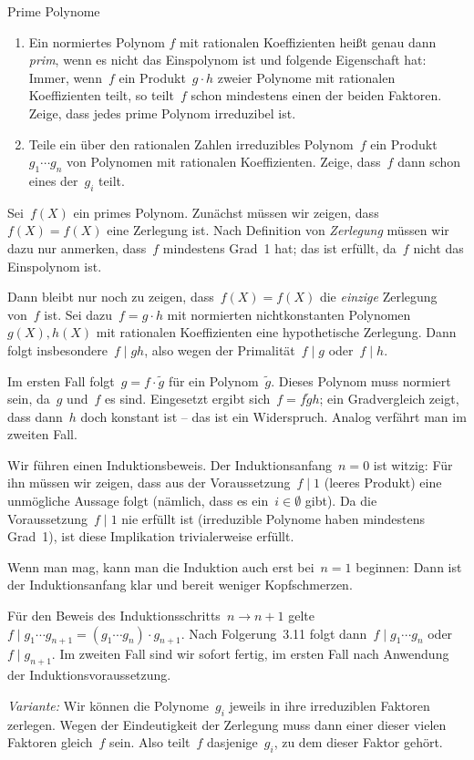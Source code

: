 \documentclass{algblatt}
\begin{document}
\ifloesungen\newpage\fi
\begin{aufgabe}{Prime Polynome}
\begin{enumerate}
\item Ein normiertes Polynom $f$ mit rationalen Koeffizienten heißt
genau dann \emph{prim}, wenn es nicht das Einspolynom ist und folgende
Eigenschaft hat: Immer, wenn~$f$ ein
Produkt~$g \cdot h$ zweier Polynome mit
rationalen Koeffizienten teilt, so teilt~$f$ schon mindestens einen der
beiden Faktoren. Zeige, dass jedes prime Polynom irreduzibel ist.
\item Teile ein über den rationalen Zahlen irreduzibles Polynom~$f$ ein
Produkt~$g_1 \cdots g_n$ von Polynomen mit rationalen Koeffizienten.
Zeige, dass~$f$ dann schon eines der~$g_i$ teilt.
\end{enumerate}

\begin{loesungE}
\item Sei~$f(X)$ ein primes Polynom. Zunächst müssen wir zeigen, dass~$f(X) =
f(X)$ eine Zerlegung ist. Nach Definition von \emph{Zerlegung} müssen wir dazu
nur anmerken, dass~$f$ mindestens Grad~1 hat; das ist erfüllt, da~$f$ nicht das
Einspolynom ist.

Dann bleibt nur noch zu zeigen, dass~$f(X) = f(X)$
die \emph{einzige} Zerlegung von~$f$ ist. Sei dazu~$f = g \cdot h$ mit
normierten nichtkonstanten Polynomen~$g(X), h(X)$ mit rationalen Koeffizienten
eine hypothetische Zerlegung.
Dann folgt insbesondere~$f \mid gh$, also wegen der Primalität~$f \mid g$ oder~$f
\mid h$.

Im ersten Fall folgt~$g = f \cdot \widetilde g$ für ein
Polynom~$\widetilde g$. Dieses Polynom muss normiert sein, da~$g$ und~$f$ es
sind. Eingesetzt ergibt sich~$f = f \widetilde g h$; ein Gradvergleich zeigt,
dass dann~$h$ doch konstant ist -- das ist ein Widerspruch. Analog verfährt man
im zweiten Fall.

\item Wir führen einen Induktionsbeweis. Der Induktionsanfang~$n = 0$ ist
witzig: Für ihn müssen wir zeigen, dass aus der Voraussetzung~$f \mid 1$
(leeres Produkt) eine unmögliche Aussage folgt (nämlich, dass es ein~$i \in
\emptyset$ gibt). Da die Voraussetzung~$f \mid 1$ nie erfüllt ist (irreduzible
Polynome haben mindestens Grad~1), ist diese Implikation trivialerweise
erfüllt.

Wenn man mag, kann man die Induktion auch erst bei~$n = 1$ beginnen: Dann ist
der Induktionsanfang klar und bereit weniger Kopfschmerzen.

Für den Beweis des Induktionsschritts~$n \to n + 1$ gelte~$f \mid g_1 \cdots
g_{n+1} = (g_1 \cdots g_n) \cdot g_{n+1}$. Nach Folgerung~3.11 folgt dann~$f
\mid g_1 \cdots g_n$ oder~$f \mid g_{n+1}$. Im zweiten Fall sind wir sofort
fertig, im ersten Fall nach Anwendung der Induktionsvoraussetzung.

\emph{Variante:} Wir können die Polynome~$g_i$ jeweils in ihre irreduziblen
Faktoren zerlegen. Wegen der Eindeutigkeit der Zerlegung muss dann einer dieser
vielen Faktoren gleich~$f$ sein. Also teilt~$f$ dasjenige~$g_i$, zu dem dieser
Faktor gehört.
\end{loesungE}
\end{aufgabe}
\end{document}

